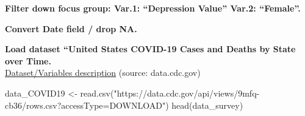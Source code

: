 \documentclass[
]{article}
\newenvironment{Shaded}{\begin{snugshade}}{\end{snugshade}}
\newcommand{\FunctionTok}[1]{\textcolor[rgb]{0.00,0.00,0.00}{#1}}
\newcommand{\NormalTok}[1]{#1}
\newcommand{\OtherTok}[1]{\textcolor[rgb]{0.56,0.35,0.01}{#1}}
\newcommand{\SpecialCharTok}[1]{\textcolor[rgb]{0.00,0.00,0.00}{#1}}
\newcommand{\StringTok}[1]{\textcolor[rgb]{0.31,0.60,0.02}{#1}}
\begin{document}
\textbf{Filter down focus group: Var.1: ``Depression Value'' Var.2:
``Female''.}

\begin{Shaded}
\end{Shaded}

\textbf{Convert Date field / drop NA.}

\begin{Shaded}
\end{Shaded}

\textbf{Load dataset ``United States COVID-19 Cases and Deaths by State
over Time.}\\
\href{https://data.cdc.gov/Case-Surveillance/United-States-COVID-19-Cases-and-Deaths-by-State-o/9mfq-cb36}{Dataset/Variables
description} (source: data.cdc.gov)

\begin{Shaded}
\begin{Highlighting}[]
\NormalTok{data\_COVID19 }\OtherTok{\textless{}{-}} \FunctionTok{read.csv}\NormalTok{(}\StringTok{"https://data.cdc.gov/api/views/9mfq{-}cb36/rows.csv?accessType=DOWNLOAD"}\NormalTok{)}
\FunctionTok{head}\NormalTok{(data\_survey)}
\end{Highlighting}
\end{Shaded}
\end{document}
